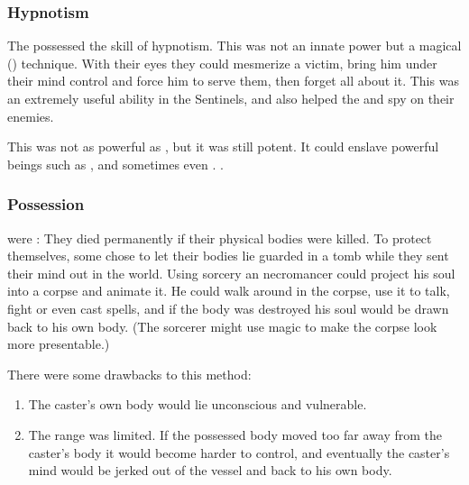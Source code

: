 \subsubsection{Hypnotism}
The \ophidians possessed the skill of hypnotism.
This was not an innate power but a magical () technique. 
With their eyes they could mesmerize a victim, bring him under their mind control and force him to serve them, then forget all about it. 
This was an extremely useful ability in the Sentinels, and also helped the \ophidians {} and spy on their enemies. 

This was not as powerful as , but it was still potent. 
It could enslave powerful beings such as \aryothim, and sometimes even \resphain.
\Ophidians {}. 






\subsubsection{Possession}
\Ophidians were : 
They died permanently if their physical bodies were killed. 
To protect themselves, some \ophidians chose to let their bodies lie guarded in a tomb while they sent their mind out in the world.
Using sorcery an \ophidian necromancer could project his soul into a corpse and animate it. 
He could walk around in the corpse, use it to talk, fight or even cast spells, and if the body was destroyed his soul would be drawn back to his own body.
(The sorcerer might use magic to make the corpse look more presentable.)

There were some drawbacks to this method:
\begin{enumerate}
  \item 
    The caster's own body would lie unconscious and vulnerable.
  \item 
    The range was limited.
    If the possessed body moved too far away from the caster's body it would become harder to control, and eventually the caster's mind would be jerked out of the vessel and back to his own body.
\end{enumerate}


